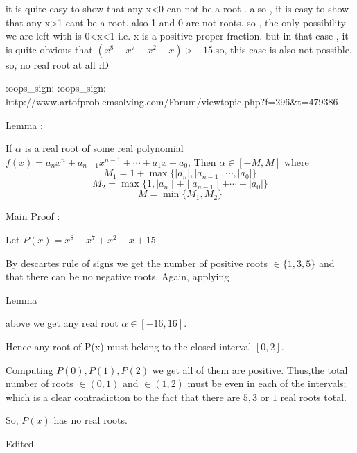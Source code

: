 \begin{solution}
	it is quite easy to show that any x<0 can not be a root . also , it is easy to show that any x>1 cant be a root.
also 1 and 0 are not roots. so , the only possibility we are left with is 0<x<1 i.e. x is a positive proper fraction.
but in that case , it is quite obvious that $(x^8-x^7+x^2-x)>-15$.so, this case is also not possible. so, no real root at all :D
\end{solution}



\begin{solution}
	:oops_sign:  :oops_sign: 
http://www.artofproblemsolving.com/Forum/viewtopic.php?f=296&t=479386
\end{solution}



\begin{solution}
	\begin{bolded}Lemma :\end{bolded} If $\alpha$ is a real root of some real polynomial $f(x)=a_nx^n+a_{n-1}x^{n-1}+\cdots+a_1x+a_0$,
Then $\alpha\in\left[-M,M\right]$ where \[M_1=1+\max\{\mid a_n\mid,\mid a_{n-1}\mid,\cdots,\mid a_0\mid\}\] \[M_2=\max\{1,\mid a_n\mid +\mid a_{n-1}\mid +\cdots+\mid a_0\mid\}\]
\[M=\min\{M_1,M_2\}\]

\begin{bolded} Main Proof :\end{bolded} Let $P(x)=x^8-x^7+x^2-x+15$

By descartes rule of signs we get the number of positive roots $\in\{1,3,5\}$ and that there can be no negative roots.
Again, applying \begin{italicized}Lemma\end{italicized} above we get any real root $\alpha\in\left[-16,16\right]$.

Hence any root of P(x) must belong to the closed interval $\left[0,2\right]$.

Computing $P(0), P(1), P(2)$ we get all of them are positive.
Thus,the total number of roots $\in\left( 0,1\right)$ and $\in\left( 1,2\right)$ must be even in each of the intervals;
which is a clear contradiction to the fact that there are $5,3$ or $1$ real roots total.

So, $P(x)$ has no real roots.

Edited
\end{solution}



